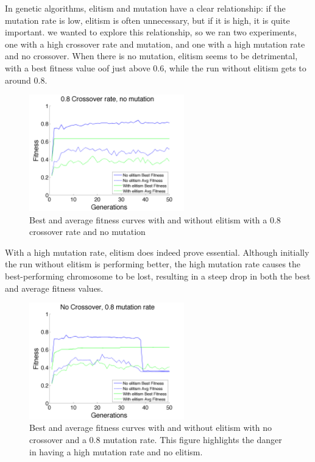 \documentclass[11pt]{article}
\begin{document}
In genetic algorithms, elitism and mutation have a clear relationship: if the mutation rate is low, elitism is often unnecessary, but if it is high, it is quite important. we wanted to explore this relationship, so we ran two experiments, one with a high crossover rate and mutation, and one with a high mutation rate and no crossover. When there is no mutation, elitism seems to be detrimental, with a best fitness value oof just above 0.6, while the run without elitism gets to around 0.8. 

\begin{figure}[H]
 \centering
  \includegraphics[width=0.6\textwidth,height=0.2\textheight]{figures/fitness0mut08cross.png}
  \caption{Best and average fitness curves with and without elitism with a 0.8 crossover rate and no mutation}
  \label{fig:fig2}  
\end{figure}

With a high mutation rate, elitism does indeed prove essential. Although initially the run without elitism is performing better, the high mutation rate causes the best-performing chromosome to be lost, resulting in a steep drop in both the best and average fitness values.
 
\begin{figure}[H]
 \centering
  \includegraphics[width=0.6\textwidth,height=0.2\textheight]{figures/fitness08mut0crossDrop.png}
  \caption{Best and average fitness curves with and without elitism with no crossover and a 0.8 mutation rate. This figure highlights the danger in having a high mutation rate and no elitism.}
  \label{fig:fig3}  
\end{figure}
\end{document}
